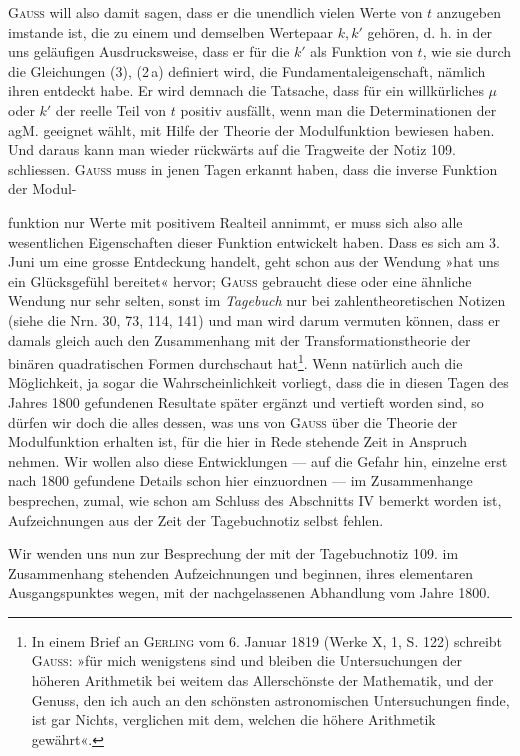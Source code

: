 \textsc{Gauss} will also damit sagen, dass er die unendlich vielen Werte von \(t\)
anzugeben imstande ist, die zu einem und demselben Wertepaar \(k,k'\) gehören,
d. h. in der uns geläufigen Ausdrucksweise, dass er für die 
\(k'\) als Funktion von \(t\), wie sie durch die Gleichungen (3), (2\,a) definiert wird,
die Fundamentaleigenschaft, nämlich ihren  entdeckt habe.
Er wird demnach die Tatsache, dass für ein willkürliches \(\mu\) oder \(k'\) der reelle
Teil von \(t\) positiv ausfällt, wenn man die Determinationen der agM. geeignet
wählt, mit Hilfe der Theorie der Modulfunktion bewiesen haben. Und daraus
kann man wieder rückwärts auf die Tragweite der Notiz 109. schliessen. \textsc{Gauss}
muss in jenen Tagen erkannt haben, dass die inverse Funktion der Modul-\par
\clearpage{}
\noindent funktion nur Werte mit positivem Realteil annimmt, er muss sich also alle
wesentlichen Eigenschaften dieser Funktion entwickelt haben. Dass es sich am
3. Juni um eine grosse Entdeckung handelt, geht schon aus der Wendung
»hat uns ein Glücksgefühl bereitet« hervor; \textsc{Gauss} gebraucht diese oder eine
ähnliche Wendung nur sehr selten, sonst im \textit{Tagebuch} nur bei zahlentheoretischen Notizen (siehe die Nrn. 30, 73, 114, 141) und man wird darum vermuten können, dass er damals gleich auch den Zusammenhang mit der Transformationstheorie der binären quadratischen Formen durchschaut hat\footnote{In einem Brief an \textsc{Gerling} vom 6. Januar 1819 (Werke X, 1, S. 122) schreibt \textsc{Gauss}: »für mich wenigstens sind und bleiben die Untersuchungen der höheren Arithmetik bei weitem das Allerschönste der Mathematik, und der Genuss, den ich auch an den schönsten astronomischen Untersuchungen finde, ist gar Nichts, verglichen mit dem, welchen die höhere Arithmetik gewährt«.}. Wenn
natürlich auch die Möglichkeit, ja sogar die Wahrscheinlichkeit vorliegt,
dass die in diesen Tagen des Jahres 1800 gefundenen Resultate später ergänzt und vertieft worden sind, so dürfen wir doch die  alles
dessen, was uns von \textsc{Gauss} über die Theorie der Modulfunktion erhalten ist,
für die hier in Rede stehende Zeit in Anspruch nehmen. Wir wollen also
diese Entwicklungen — auf die Gefahr hin, einzelne erst nach 1800 gefundene
Details schon hier einzuordnen — im Zusammenhange besprechen, zumal,
wie schon am Schluss des Abschnitts IV bemerkt worden ist, Aufzeichnungen
aus der Zeit der Tagebuchnotiz selbst fehlen.

Wir wenden uns nun zur Besprechung der mit der Tagebuchnotiz 109.
im Zusammenhang stehenden Aufzeichnungen und beginnen, ihres elementaren
Ausgangspunktes wegen, mit der nachgelassenen Abhandlung vom Jahre 1800.

